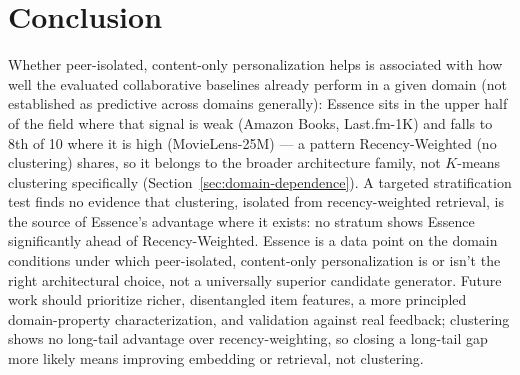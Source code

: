 \documentclass{article}
\begin{document}
\section{Conclusion}
\label{sec:conclusion}

Whether peer-isolated, content-only personalization helps is associated with how well the evaluated collaborative baselines already perform in a given domain (not established as predictive across domains generally): Essence sits in the upper half of the field where that signal is weak (Amazon Books, Last.fm-1K) and falls to 8th of 10 where it is high (MovieLens-25M) --- a pattern Recency-Weighted (no clustering) shares, so it belongs to the broader architecture family, not $K$-means clustering specifically (Section~\ref{sec:domain-dependence}). A targeted stratification test finds no evidence that clustering, isolated from recency-weighted retrieval, is the source of Essence's advantage where it exists: no stratum shows Essence significantly ahead of Recency-Weighted. Essence is a data point on the domain conditions under which peer-isolated, content-only personalization is or isn't the right architectural choice, not a universally superior candidate generator. Future work should prioritize richer, disentangled item features, a more principled domain-property characterization, and validation against real feedback; clustering shows no long-tail advantage over recency-weighting, so closing a long-tail gap more likely means improving embedding or retrieval, not clustering.
\end{document}
